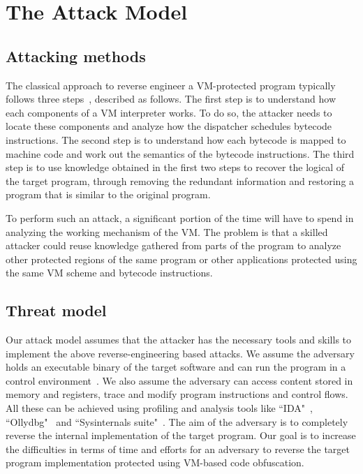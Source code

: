 \section{The Attack Model}\label{sec:attack}
\subsection{Attacking methods}
The classical approach to reverse engineer a VM-protected program typically
follows three steps~\cite{10falliere2009inside,17rolles2009unpacking}, described as follows.
The first step is to understand how each components of a VM interpreter works.
To do so, the attacker needs to locate
these components and analyze how the dispatcher schedules bytecode instructions.
The second step is to understand how each bytecode is mapped to machine code
and work out the semantics of the bytecode instructions.
The third step is to use knowledge obtained in the first two steps to recover the
logical of the target program, through removing the redundant information
and restoring a program that is similar to the original program.


To perform such an attack, a significant portion of the time will have to spend in analyzing the working
mechanism of the VM.
The problem is that a skilled attacker could  reuse knowledge
gathered from parts of the program to analyze other protected regions of
the same program or other applications protected using the same VM scheme and bytecode instructions.

\subsection{Threat model}
Our attack model assumes that the attacker has the necessary tools and skills to implement the above reverse-engineering based attacks.
We assume the adversary holds an executable binary of the
target software and can run the program in a control
environment~\cite{11collberg2002watermarking}. We also assume the adversary
can access content stored in memory and registers, trace and modify program
instructions and control flows.
All these can be achieved using profiling and analysis tools like ``IDA"~\cite{14Idapro}, ``Ollydbg"~\cite{15Ollydbg} and
``Sysinternals suite"~\cite{16Sysinternalssuite}. The aim of the adversary is
to completely reverse the internal implementation of the target program.
Our goal is to increase the difficulties in terms of time and efforts for an adversary to
reverse the target program implementation protected using VM-based code obfuscation. 